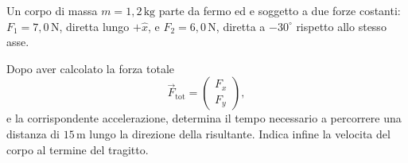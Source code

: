 
\begin{esercizio}
Un corpo di massa \(m = 1{,}2\,\mathrm{kg}\) parte da fermo ed e soggetto a due
forze costanti: \(F_1 = 7{,}0\,\mathrm{N}\), diretta lungo \(+\hat x\), e
\(F_2 = 6{,}0\,\mathrm{N}\), diretta a \(-30^\circ\) rispetto allo stesso
asse.

Dopo aver calcolato la forza totale
\[
\vec F_\text{tot} =
\begin{pmatrix}
F_x \\[4pt]
F_y
\end{pmatrix},
\]
e la corrispondente accelerazione, determina il tempo necessario a percorrere
una distanza di \(15\,\mathrm{m}\) lungo la direzione della risultante. Indica
infine la velocita del corpo al termine del tragitto.
\end{esercizio}

